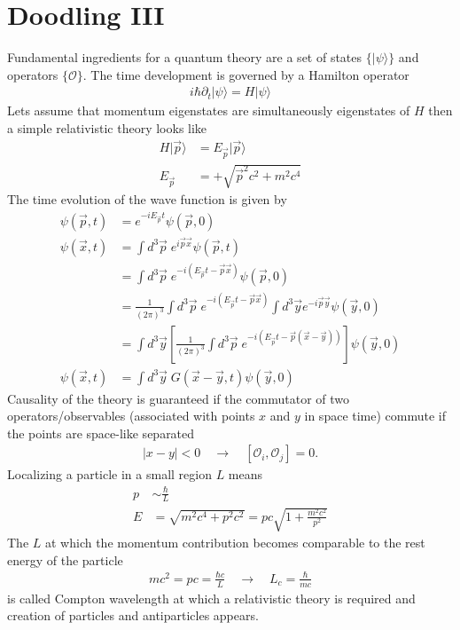 \documentclass[10pt,a4paper]{book}
\theoremstyle{definition}
\begin{document}
\chapter{Doodling III}
Fundamental ingredients for a quantum theory are a set of states $\{|\psi\rangle\}$ and operators $\{\mathcal{O}\}$. The time development is governed by a Hamilton operator
\begin{align}
    i\hbar\partial_t|\psi\rangle=H|\psi\rangle
\end{align}
Lets assume that momentum eigenstates are simultaneously eigenstates of $H$ then a simple relativistic theory looks like
\begin{align}
    H|\vec{p}\rangle&= E_{\vec{p}}|\vec{p}\rangle\\
    E_{\vec{p}}&=+\sqrt{\vec{p}^2c^2+m^2c^4}
\end{align}
The time evolution of the wave function is given by
\begin{align}
    \psi(\vec{p},t) &= e^{-iE_{\vec{p}} t} \psi(\vec{p},0)\\
    \psi(\vec{x},t) &= \int d^3\vec{p}\;e^{i\vec{p}\vec{x}}\psi(\vec{p},t)\\
    &=\int d^3\vec{p}\;e^{-i(E_{\vec{p}} t-\vec{p}\vec{x})}\psi(\vec{p},0)\\
    &=\frac{1}{(2\pi)^3}\int d^3\vec{p}\;e^{-i(E_{\vec{p}} t-\vec{p}\vec{x})}\int d^3\vec{y}e^{-i\vec{p}\vec{y}}\psi(\vec{y},0)\\
    &=\int d^3\vec{y}\left[\frac{1}{(2\pi)^3}\int d^3\vec{p}\;e^{-i(E_{\vec{p}} t-\vec{p}(\vec{x}-\vec{y}))}\right]\psi(\vec{y},0)\\
    \psi(\vec{x},t) &= \int d^3\vec{y}\;G(\vec{x}-\vec{y},t) \psi(\vec{y},0)
\end{align}
Causality of the theory is guaranteed if the commutator of two operators/observables (associated with points $x$ and $y$ in space time) commute if the points are space-like separated
\begin{align}
    |x-y|<0\quad\rightarrow\quad [\mathcal{O}_i,\mathcal{O}_j]=0.
\end{align}
Localizing a particle in a small region $L$ means
\begin{align}
    p&\sim\frac{\hbar}{L}\\
    E&=\sqrt{m^2c^4+p^2c^2}= pc\sqrt{1+\frac{m^2c^2}{p^2}}
\end{align}
The $L$ at which the momentum contribution becomes comparable to the rest energy of the particle
\begin{align}
    mc^2=pc = \frac{\hbar c}{L}\quad\rightarrow\quad L_c=\frac{\hbar}{mc}
\end{align}
is called Compton wavelength at which a relativistic theory is required and creation of particles and antiparticles appears.
\end{document}
